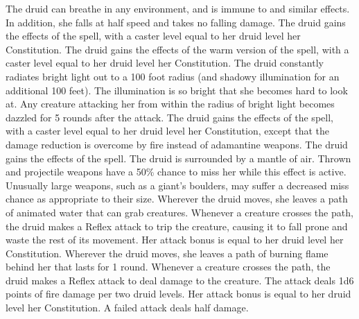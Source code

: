  The druid can breathe in any environment, and is immune to  and similar effects. In addition, she falls at half speed and takes no falling damage.
 The druid gains the effects of the  spell, with a caster level equal to her druid level \add her Constitution.
 The druid gains the effects of the warm version of the  spell, with a caster level equal to her druid level \add her Constitution.
 The druid constantly radiates bright light out to a 100 foot radius (and shadowy illumination for an additional 100 feet). The illumination is so bright that she becomes hard to look at. Any creature attacking her from within the radius of bright light becomes dazzled for 5 rounds after the attack.
 The druid gains the effects of the  spell, with a caster level equal to her druid level \add her Constitution, except that the damage reduction is overcome by fire instead of adamantine weapons.
 The druid gains the effects of the  spell.
  The druid is surrounded by a mantle of air. Thrown and projectile weapons have a 50\% chance to miss her while this effect is active. Unusually large weapons, such as a giant's boulders, may suffer a decreased miss chance as appropriate to their size.
  Wherever the druid moves, she leaves a path of animated water that can grab creatures. Whenever a creature crosses the path, the druid makes a Reflex attack to trip the creature, causing it to fall prone and waste the rest of its movement. Her attack bonus is equal to her druid level \add her Constitution.
 Wherever the druid moves, she leaves a path of burning flame behind her that lasts for 1 round. Whenever a creature crosses the path, the druid makes a Reflex attack to deal damage to the creature. The attack deals 1d6 points of fire damage per two druid levels. Her attack bonus is equal to her druid level \add her Constitution. A failed attack deals half damage.
